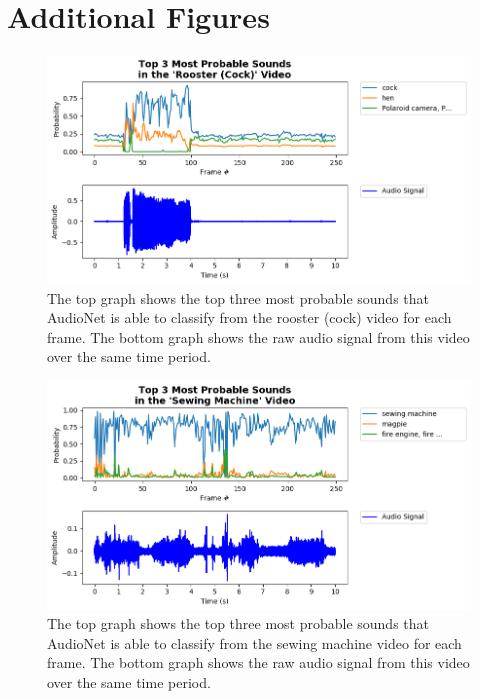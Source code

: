 \documentclass[12pt,twoside]{article}
\theoremstyle{plain}
\theoremstyle{definition}
\theoremstyle{remark}
\begin{document}
\section{Additional Figures}
\label{sec:additional_figures}
\begin{figure}[h]
   \centerline{\includegraphics[width=\textwidth]{inf_rooster.png}}
   {\caption{\footnotesize The top graph shows the top three most probable sounds that AudioNet is able to classify from the rooster (cock) video for each frame.
             The bottom graph shows the raw audio signal from this video over the same time period.}
     \label{fig:inf_rooster}}
\end{figure}

\begin{figure}[h]
   \centerline{\includegraphics[width=\textwidth]{inf_sewing_machine.png}}
   {\caption{\footnotesize The top graph shows the top three most probable sounds that AudioNet is able to classify from the sewing machine video for each frame.
             The bottom graph shows the raw audio signal from this video over the same time period.}
     \label{fig:inf_sewing_machine}}
\end{figure}
\end{document}
